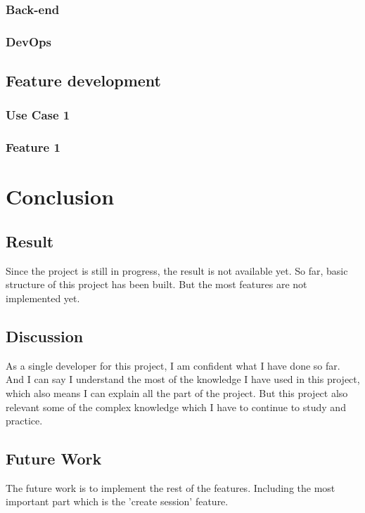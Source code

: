 \documentclass[]{article}
\begin{document}
\subsubsection{Back-end}

\subsubsection{DevOps}

\subsection{Feature development} 

\subsubsection{Use Case 1}

\subsubsection{Feature 1}

\pagebreak
\section{Conclusion} 
\subsection{Result}
Since the project is still in progress, the result is not available yet.
So far, basic structure of this project has been built. But the most features 
are not implemented yet. 
\subsection{Discussion}
As a single developer for this project, I am confident what I have done so far.
And I can say I understand the most of the knowledge I have used in this project, 
which also means I can explain all the part of the project. 
But this project also relevant some of the complex knowledge which I have to continue 
to study and practice.
\subsection{Future Work}
The future work is to implement the rest of the features. 
Including the most important part which is the 'create session' feature.
\pagebreak
% 
\pagebreak
\end{document}
